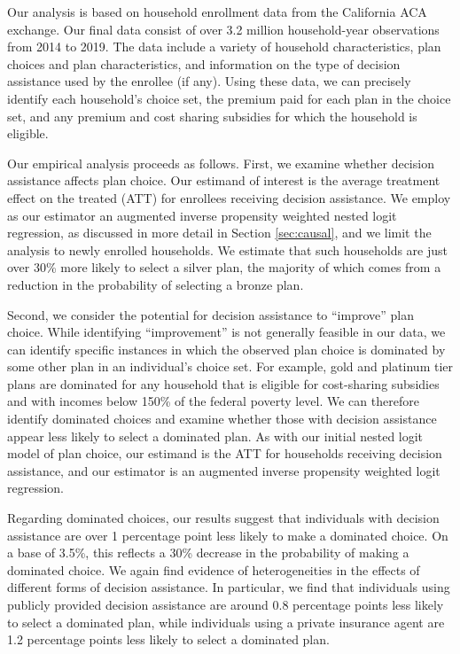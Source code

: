 \documentclass[12pt]{article}
\begin{document}
Our analysis is based on household enrollment data from the California ACA exchange. Our final data consist of over 3.2 million household-year observations from 2014 to 2019. The data include a variety of household characteristics, plan choices and plan characteristics, and information on the type of decision assistance used by the enrollee (if any). Using these data, we can precisely identify each household's choice set, the premium paid for each plan in the choice set, and any premium and cost sharing subsidies for which the household is eligible.

Our empirical analysis proceeds as follows. First, we examine whether decision assistance affects plan choice. Our estimand of interest is the average treatment effect on the treated (ATT) for enrollees receiving decision assistance. We employ as our estimator an augmented inverse propensity weighted nested logit regression, as discussed in more detail in Section \ref{sec:causal}, and we limit the analysis to newly enrolled households. We estimate that such households are just over 30\% more likely to select a silver plan, the majority of which comes from a reduction in the probability of selecting a bronze plan.

Second, we consider the potential for decision assistance to ``improve'' plan choice. While identifying ``improvement'' is not generally feasible in our data, we can identify specific instances in which the observed plan choice is dominated by some other plan in an individual's choice set. For example, gold and platinum tier plans are dominated for any household that is eligible for cost-sharing subsidies and with incomes below 150\% of the federal poverty level. We can therefore identify dominated choices and examine whether those with decision assistance appear less likely to select a dominated plan. As with our initial nested logit model of plan choice, our estimand is the ATT for households receiving decision assistance, and our estimator is an augmented inverse propensity weighted logit regression. 

Regarding dominated choices, our results suggest that individuals with decision assistance are over 1 percentage point less likely to make a dominated choice. On a base of 3.5\%, this reflects a 30\% decrease in the probability of making a dominated choice. We again find evidence of heterogeneities in the effects of different forms of decision assistance. In particular, we find that individuals using publicly provided decision assistance are around 0.8 percentage points less likely to select a dominated plan, while individuals using a private insurance agent are 1.2 percentage points less likely to select a dominated plan.
\end{document}
